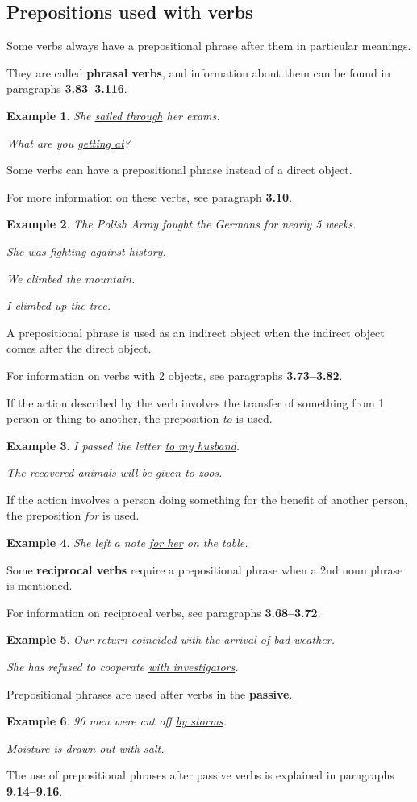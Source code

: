 \documentclass[oneside]{book}
\numberwithin{equation}{section}
\newtheorem{example}{Example}[section]
\begin{document}
\subsection{Prepositions used with verbs}
\noindent{} Some verbs always have a prepositional phrase after them in particular meanings.

They are called \textbf{phrasal verbs}, and information about them can be found in paragraphs \textbf{3.83--3.116}.
\begin{example}
    She \underline{sailed through} her exams.
    
    What are you \underline{getting at}?
\end{example}
%
\noindent{} Some verbs can have a prepositional phrase instead of a direct object.

For more information on these verbs, see paragraph \textbf{3.10}.
\begin{example}
    The Polish Army fought the Germans for nearly 5 weeks.
    
    She was fighting \underline{against history}.
    
    We climbed the mountain.
    
    I climbed \underline{up the tree}.
\end{example}
%
\noindent{} A prepositional phrase is used as an indirect object when the indirect object comes after the direct object.

%
For information on verbs with 2 objects, see paragraphs \textbf{3.73--3.82}.

%
If the action described by the verb involves the transfer of something from 1 person or thing to another, the preposition \textit{to} is used.
\begin{example}
    I passed the letter \underline{to my husband}.
    
    The recovered animals will be given \underline{to zoos}.
\end{example}
If the action involves a person doing something for the benefit of another person, the preposition \textit{for} is used.
\begin{example}
    She left a note \underline{for her} on the table.
\end{example}
%
\noindent{} Some \textbf{reciprocal verbs} require a prepositional phrase when a 2nd noun phrase is mentioned.

%
For information on reciprocal verbs, see paragraphs \textbf{3.68--3.72}.
\begin{example}
    Our return coincided \underline{with the arrival of bad weather}.
    
    She has refused to cooperate \underline{with investigators}.
\end{example}
%
\noindent{} Prepositional phrases are used after verbs in the \textbf{passive}.
\begin{example}
    90 men were cut off \underline{by storms}.
    
    Moisture is drawn out \underline{with salt}.
\end{example}
The use of prepositional phrases after passive verbs is explained in paragraphs \textbf{9.14--9.16}.
\end{document}
